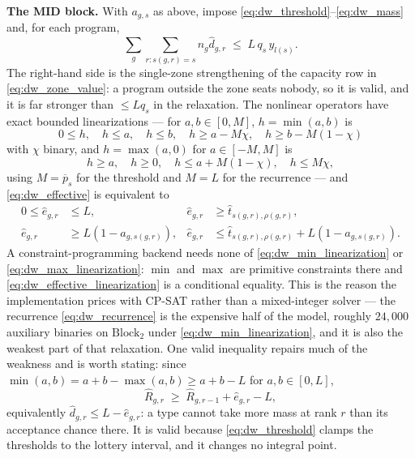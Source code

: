 \documentclass{article}
\begin{document}
\noindent\textbf{The MID block.} With $a_{g,s}$ as above, impose
\eqref{eq:dw_threshold}--\eqref{eq:dw_mass} and, for each program,
\begin{equation}\label{eq:dw_mid_capacity}
\sum_{g}\sum_{r : s(g,r)=s} n_g \widehat d_{g,r} \;\leq\; L\, q_s\, y_{l(s)} .
\end{equation}
The right-hand side is the single-zone strengthening of the capacity row in
\eqref{eq:dw_zone_value}: a program outside the zone seats nobody, so it is
valid, and it is far stronger than $\le L q_s$ in the relaxation. The nonlinear
operators have exact bounded linearizations --- for $a, b \in [0,M]$,
$h = \min(a,b)$ is
\begin{equation}\label{eq:dw_min_linearization}
0\leq h,\quad h\leq a,\quad h\leq b,\quad
h\geq a-M\chi,\quad h\geq b-M(1-\chi)
\end{equation}
with $\chi$ binary, and $h = \max(a, 0)$ for $a \in [-M, M]$ is
\begin{equation}\label{eq:dw_max_linearization}
h\geq a,\quad h\geq0,\quad
h\leq a+M(1-\chi),\quad h\leq M\chi ,
\end{equation}
using $M = \overline p_s$ for the threshold and $M = L$ for the recurrence ---
and \eqref{eq:dw_effective} is equivalent to
\begin{equation}\label{eq:dw_effective_linearization}
\begin{aligned}
0\leq\widehat e_{g,r}&\leq L, &
\widehat e_{g,r}&\geq\widehat t_{s(g,r),\rho(g,r)},\\
\widehat e_{g,r}&\geq L(1-a_{g,s(g,r)}), &
\widehat e_{g,r}&\leq\widehat t_{s(g,r),\rho(g,r)}+L(1-a_{g,s(g,r)}).
\end{aligned}
\end{equation}
A constraint-programming backend needs none of \eqref{eq:dw_min_linearization}
or \eqref{eq:dw_max_linearization}: $\min$ and $\max$ are primitive
constraints there and \eqref{eq:dw_effective_linearization} is a conditional
equality. This is the reason the implementation prices with CP-SAT rather than a
mixed-integer solver --- the recurrence \eqref{eq:dw_recurrence} is the
expensive half of the model, roughly $24{,}000$ auxiliary binaries on
$\text{Block}_2$ under \eqref{eq:dw_min_linearization}, and it is also the
weakest part of that relaxation. One valid inequality repairs much of the
weakness and is worth stating: since
$\min(a,b) = a + b - \max(a,b) \geq a + b - L$ for $a, b \in [0, L]$,
\begin{equation}\label{eq:dw_min_valid}
\widehat R_{g,r} \;\geq\; \widehat R_{g,r-1} + \widehat e_{g,r} - L ,
\end{equation}
equivalently $\widehat d_{g,r} \le L - \widehat e_{g,r}$: a type cannot take
more mass at rank $r$ than its acceptance chance there. It is valid because
\eqref{eq:dw_threshold} clamps the thresholds to the lottery interval, and it
changes no integral point.
\end{document}
